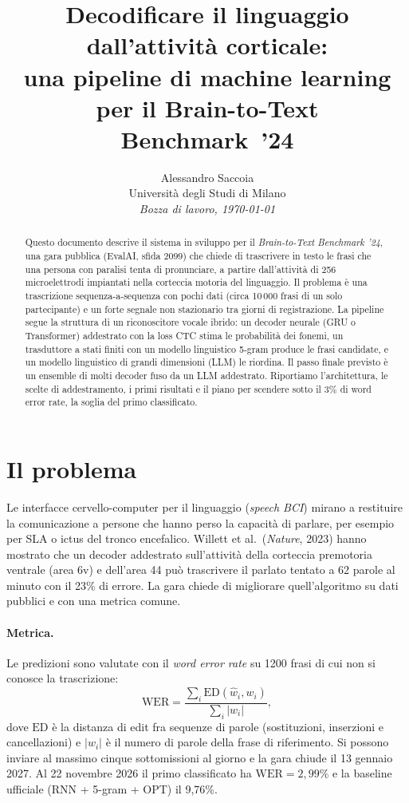 \documentclass[10pt,a4paper]{article}
\title{Decodificare il linguaggio dall'attività corticale:\\
una pipeline di machine learning per il Brain-to-Text Benchmark~'24}
\author{Alessandro Saccoia\\\small Università degli Studi di Milano\\\small\textit{Bozza di lavoro, \today}}
\date{}
\newcommand{\WER}{\mathrm{WER}}
\begin{document}
\maketitle

\begin{abstract}
Questo documento descrive il sistema in sviluppo per il \emph{Brain-to-Text Benchmark '24}, una gara pubblica (EvalAI, sfida 2099) che chiede di trascrivere in testo le frasi che una persona con paralisi tenta di pronunciare, a partire dall'attività di 256 microelettrodi impiantati nella corteccia motoria del linguaggio. Il problema è una trascrizione sequenza-a-sequenza con pochi dati (circa 10\,000 frasi di un solo partecipante) e un forte segnale non stazionario tra giorni di registrazione. La pipeline segue la struttura di un riconoscitore vocale ibrido: un decoder neurale (GRU o Transformer) addestrato con la loss CTC stima le probabilità dei fonemi, un trasduttore a stati finiti con un modello linguistico 5-gram produce le frasi candidate, e un modello linguistico di grandi dimensioni (LLM) le riordina. Il passo finale previsto è un ensemble di molti decoder fuso da un LLM addestrato. Riportiamo l'architettura, le scelte di addestramento, i primi risultati e il piano per scendere sotto il 3\% di word error rate, la soglia del primo classificato.
\end{abstract}

\section{Il problema}

Le interfacce cervello-computer per il linguaggio (\emph{speech BCI}) mirano a restituire la comunicazione a persone che hanno perso la capacità di parlare, per esempio per SLA o ictus del tronco encefalico. Willett et al.\ (\emph{Nature}, 2023) hanno mostrato che un decoder addestrato sull'attività della corteccia premotoria ventrale (area 6v) e dell'area 44 può trascrivere il parlato tentato a 62 parole al minuto con il 23\% di errore. La gara chiede di migliorare quell'algoritmo su dati pubblici e con una metrica comune.

\paragraph{Metrica.} Le predizioni sono valutate con il \emph{word error rate} su 1200 frasi di cui non si conosce la trascrizione:
\begin{equation}
\WER = \frac{\sum_{i} \mathrm{ED}(\hat w_i, w_i)}{\sum_i |w_i|},
\end{equation}
dove $\mathrm{ED}$ è la distanza di edit fra sequenze di parole (sostituzioni, inserzioni e cancellazioni) e $|w_i|$ è il numero di parole della frase di riferimento. Si possono inviare al massimo cinque sottomissioni al giorno e la gara chiude il 13 gennaio 2027. Al 22 novembre 2026 il primo classificato ha $\WER=2{,}99\%$ e la baseline ufficiale (RNN + 5-gram + OPT) il 9{,}76\%.
\end{document}
